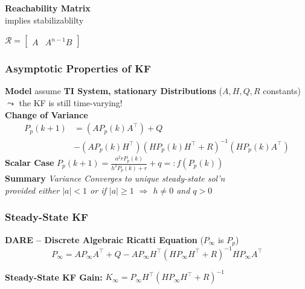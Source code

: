 \begin{minipage}[c]{0.40\linewidth}
    \textbf{Reachability Matrix} \\
    implies stabilizablilty
\end{minipage}
\begin{minipage}[c]{0.3\linewidth}
    $\mathcal{R} = \left[\begin{smallmatrix}
        A &
        A^{n-1}B
    \end{smallmatrix}\right]$
\end{minipage}

\subsubsection{Asymptotic Properties of KF}
\textbf{Model} assume \textbf{TI System, stationary Distributions} ($A, H, Q, R$ constants) \\
$\leadsto$ the KF is still time-varying!\\
\textbf{Change of Variance}
\begin{align*}
    P_p({\scriptstyle k+1}) &= \left(A  P_p({\scriptstyle k}) A^\top\right) + Q \\
    &- \left( A P_p({\scriptstyle k}) H^\top \right) 
    \left( H  P_p({\scriptstyle k}) H^\top \!\!+\! R \right)^{-1} 
    \left( H P_p({\scriptstyle k}) A^\top\right)
\end{align*}
\textbf{Scalar Case} $P_p(k+1) = \frac{a^2 r P_p(k)}{h^2 P_p(k) + r}+q =: f(P_p(k))$ \\
\textbf{Summary} 
\textit{Variance Converges to unique steady-state sol'n \\
provided either $\lvert a\rvert <1$ or if $\lvert a \rvert \geq 1$ $\Rightarrow$ 
$h \neq 0$ and $q >0$}\\

\subsubsection{Steady-State KF}
\textbf{DARE -- Discrete Algebraic Ricatti Equation} ($P_\infty$ is $P_p$)
\begin{equation*}
    P_\infty = A P_\infty A^\top + Q 
    - AP_\infty H^\top 
    (H P_\infty H^\top + R)^{-1}
    H P_\infty A^\top
\end{equation*}

\textbf{Steady-State KF Gain: } $K_\infty = P_\infty H^\top (H P_\infty H^\top \!\!+\! R)^{-1}$



